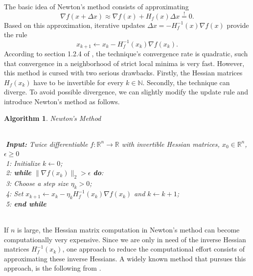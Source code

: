 \documentclass[11pt, a4paper]{article}
\newtheorem{algorithm}[theorem]{Algorithm}
\newcommand{\N}{\mathbb{N}}
\newcommand{\R}{\mathbb{R}}
\begin{document}
The basic idea of Newton's method consists of approximating
\[ \nabla f(x+ \Delta x) \approx \nabla f(x) + H_f(x) \Delta x \stackrel{!}{=} 0. \]
Based on this approximation, iterative updates $ \Delta x = - H_f^{-1}(x) \nabla f(x)$ provide the rule
\[ x_{k+1} \leftarrow x_k - H_f^{-1}(x_k) \nabla f(x_k). \]
According to section 1.2.4 of \cite{ConvexOptimization}, the technique's convergence rate is quadratic, such that convergence in a neighborhood of strict local minima is very fast. However, this method is cursed with two serious drawbacks. Firstly, the Hessian matrices $H_f(x_k)$ have to be invertible for every $k \in \N$. Secondly, the technique can diverge. To avoid possible divergence, we can slightly modify the update rule and introduce Newton's method as follows.

\begin{algorithm}
\caption{Newton's Method \textcolor{white}{$\Big |$}} \ \\
\textcolor{white}{$\Big |$}\textbf{Input:} Twice differentiable $f: \R^n \to \R$ with invertible Hessian matrices, $x_0 \in \R^n$, $\epsilon \geq 0$ \\
\textcolor{white}{$\Big |$}1: Initialize $k \leftarrow 0$; \\
\textcolor{white}{$\Big |$}2: \textbf{while} $ \big \| \nabla f(x_k) \big \|_2 > \epsilon $ \textbf{do}: \\
\textcolor{white}{$\Big |$}3: \quad Choose a step size $\eta_k > 0$; \\
\textcolor{white}{$\Big |$}4: \quad Set $x_{k+1} \leftarrow x_k - \eta_k H_f^{-1}(x_k) \nabla f(x_k)$ and $k \leftarrow k+1$; \\
\textcolor{white}{$\Big |$}5: \textbf{end while}
\end{algorithm}
\ \\

If $n$ is large, the Hessian matrix computation in Newton's method can become computationally very expensive. Since we are only in need of the inverse Hessian matrices $H_f^{-1}(x_k)$, one approach to reduce the computational effort consists of approximating these inverse Hessians. A widely known method that pursues this approach, is the following from \cite{BFGS}.
\end{document}
